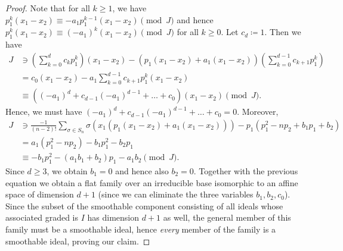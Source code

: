 \documentclass[11pt]{amsart}
\theoremstyle{definition}
\begin{document}
\begin{proof}
Note that for all $k \geq 1$, we have $p_1^k(x_1 - x_2) \equiv -a_1 p_1^{k-1}(x_1-x_2) \pmod J$ and hence $p_1^k(x_1-x_2) \equiv (-a_1)^k(x_1-x_2) \pmod J$ for all $k \geq 0$.
Let $c_d \coloneqq 1$. Then we have
\begin{align*}
    J &\ni \left( \sum_{k=0}^d c_k p_1^k \right)(x_1-x_2) - (p_1(x_1-x_2) + a_1(x_1-x_2)) \left( \sum_{k=0}^{d-1} c_{k+1}p_1^k \right) \\
    &= c_0 (x_1-x_2) - a_1 \sum_{k=0}^{d-1} c_{k+1} p_1^k (x_1-x_2) \\
    &\equiv \left( (-a_1)^d + c_{d-1}(-a_1)^{d-1} + \ldots + c_0 \right) (x_1-x_2) \pmod J .
\end{align*}
Hence, we must have $(-a_1)^d + c_{d-1}(-a_1)^{d-1} + \ldots + c_0 = 0$.
Moreover,
\begin{align*}
    J &\ni \frac{-1}{(n-2)!} \sum_{\sigma \in S_n} \sigma (x_1(p_1(x_1-x_2) + a_1(x_1-x_2))) - p_1(p_1^2 - np_2 + b_1 p_1 + b_2) \\
    &= a_1 (p_1^2 - n p_2) - b_1 p_1^2 - b_2 p_1 \\
    &\equiv -b_1 p_1^2 - (a_1 b_1 + b_2)p_1 - a_1 b_2 \pmod J .
\end{align*}
Since $d \geq 3$, we obtain $b_1 = 0$ and hence also $b_2 = 0$. Together with the previous equation we obtain a flat family over an irreducible base isomorphic to an affine space of dimension $d+1$ (since we can eliminate the three variables $b_1,b_2,c_0$). Since the subset of the smoothable component consisting of all ideals whose associated graded is $I$ has dimension $d+1$ as well, the general member of this family must be a smoothable ideal, hence \emph{every} member of the family is a smoothable ideal, proving our claim.


\end{proof}
\end{document}
